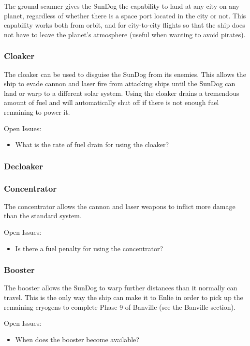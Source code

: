 The ground scanner gives the SunDog the capability to land at any city
on any planet, regardless of whether there is a space port located in
the city or not.  This capability works both from orbit, and for
city-to-city flights so that the ship does not have to leave the planet's
atmosphere (useful when wanting to avoid pirates).

\subsubsection{Cloaker}

The cloaker can be used to disguise the SunDog from its enemies.  This allows
the ship to evade cannon and laser fire from attacking ships until the
SunDog can land or warp to a different solar system.  Using the cloaker
drains a tremendous amount of fuel and will automatically shut off if there
is not enough fuel remaining to power it.

Open Issues:
\begin{itemize}
\item What is the rate of fuel drain for using the cloaker?
\end{itemize}

\subsubsection{Decloaker}

\subsubsection{Concentrator}

The concentrator allows the cannon and laser weapons to inflict more damage
than the standard system.

Open Issues:
\begin{itemize}
\item Is there a fuel penalty for using the concentrator?
\end{itemize}

\subsubsection{Booster}

The booster allows the SunDog to warp further distances than it normally
can travel.  This is the only way the ship can make it to Enlie in order
to pick up the remaining cryogens to complete Phase 9 of Banville (see the
Banville section).

Open Issues:
\begin{itemize}
\item When does the booster become available?
\end{itemize}



